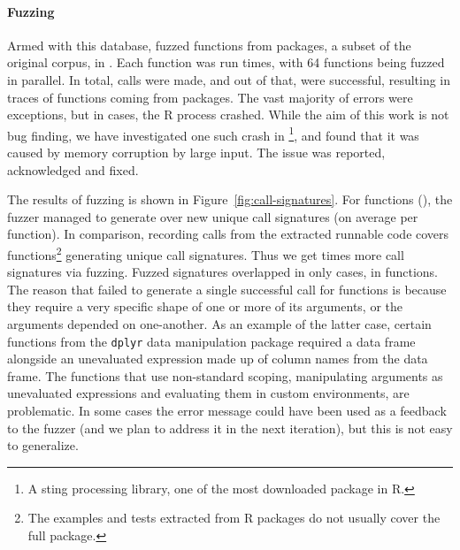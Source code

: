 \documentclass[sigplan,anonymous,review]{acmart}
\begin{document}
\paragraph{Fuzzing}

Armed with this database, \tool fuzzed \UFNumFunctions functions from \UFNumPackages packages, a subset of the original corpus, in \UFTracingTime.
Each function was run \UFTracingBudget times, with 64 functions being fuzzed in parallel.
In total, \UFNumTracesRnd calls were made, and out of that, \UFRatioSucesssTraces were successful, resulting in \UFNumSuccessTraces traces of \UFNumSuccessFunctions functions coming from \UFNumSuccessPackages packages.
The vast majority of errors were exceptions, but in \UFNumCrashedRSessions cases, the R process crashed.
While the aim of this work is not bug finding, we have investigated one such crash in \footnote{A sting processing library, one of the most downloaded package in R.}, and found that it was caused by memory corruption by large input.
The issue was reported, acknowledged and fixed.

The results of fuzzing is shown in Figure~\ref{fig:call-signatures}.
For \UFNumFunctionsSignatrSignatrue functions (\UFNumFunctionsSignatrToCorpusSignatureRatio), the fuzzer managed to generate over \UFSignatrSignaturesRnd new unique call signatures (on average \UFAvgNewSignatrSignature per function).
In comparison, recording calls from the extracted runnable code covers \UFNumFunctionsBaselineToCorpusSignatureRatio functions\footnote{The examples and tests extracted from R packages do not usually cover the full package.} generating \UFOnlyBaselineSignatures unique call signatures.
Thus we get \UFSignatrBaselineSignaturesRatio times more call signatures via fuzzing.
Fuzzed signatures overlapped in only \UFSharedSignatures cases, in \UFSharedSignatuesFunctions functions.
The reason that \tool failed to generate a single successful call for \UFNumMissingFunctionSignatr functions is because they require a very specific shape of one or more of its arguments, or the arguments depended on one-another.
As an example of the latter case, certain functions from the {\tt dplyr} data manipulation package required a data frame alongside an unevaluated expression made up of column names from the data frame. 
The functions that use non-standard scoping, manipulating arguments as unevaluated expressions and evaluating them in custom environments, are problematic.
In some cases the error message could have been used as a feedback to the fuzzer (and we plan to address it in the next iteration), but this is not easy to generalize.
\end{document}
